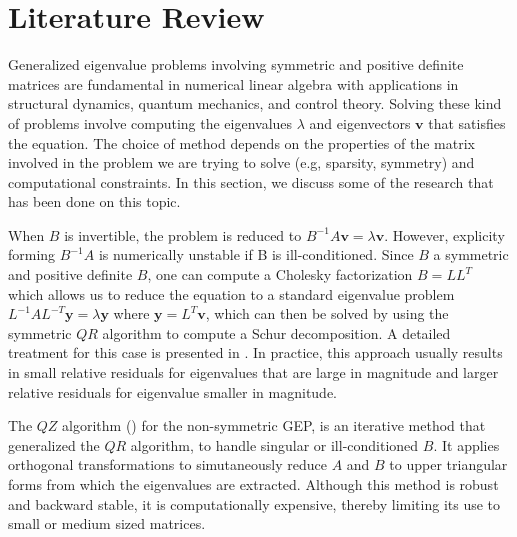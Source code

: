 \section{Literature Review}\label{sec:LiteratureReview}
Generalized eigenvalue problems involving symmetric and positive definite matrices are fundamental in numerical linear algebra with applications in structural  dynamics, quantum mechanics, and control theory. Solving these kind of problems involve computing the eigenvalues $\lambda$ and eigenvectors $\mathbf{v}$ that satisfies the equation. The choice of method depends on the properties of the matrix involved in the problem we are trying to solve (e.g, sparsity, symmetry) and computational constraints. In this section, we discuss some of the research that has been done on this topic.

When $B$ is invertible, the problem is reduced to $B^{-1}A\mathbf{v} = \lambda \mathbf{v}$. However, explicity forming $B^{-1}A$ is numerically unstable if B is ill-conditioned. Since $B$ a symmetric and positive definite $B$, one can compute a Cholesky factorization $B = LL^{T}$ which allows us to reduce the equation to a standard eigenvalue problem $L^{-1}AL^{-T}\mathbf{y} = \lambda \mathbf{y}$ where $\mathbf{y}= L^T \mathbf{v}$, which can then be solved by using the symmetric $QR$ algorithm to compute a Schur decomposition. A detailed treatment for this case is presented in \cite{doi:10.1137/1.9781421407944}. In practice, this approach usually results in small relative residuals for eigenvalues that are large in magnitude and larger relative residuals for eigenvalue smaller in magnitude.

The $QZ$ algorithm (\cite{5b3d5fb1-4813-3046-9331-a730b392f611}) for the non-symmetric GEP, is an iterative method that generalized the $QR$ algorithm, to handle singular or ill-conditioned $B$. It applies orthogonal transformations to simutaneously reduce $A$ and $B$ to upper triangular forms from which the eigenvalues are extracted. Although this method is robust and backward stable, it is computationally expensive, thereby limiting its use to small or medium sized matrices.

